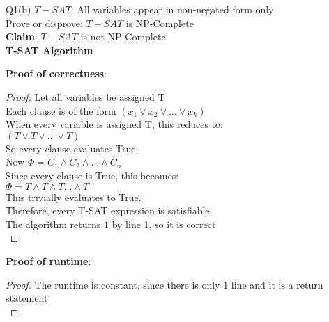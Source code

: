 \begin{problem}
    {Q1(b)}
    $T-SAT$: All variables appear in non-negated form only \\
    Prove or disprove: $T-SAT$ is NP-Complete \\
    \textbf{Claim}: $T-SAT$ is not NP-Complete \\
    \textbf{T-SAT Algorithm}
    \begin{algorithmic}[1]
    \end{algorithmic}
    \noindent
    \textbf{Proof of correctness}:
    \begin{proof}
        Let all variables be assigned T \\
        Each clause is of the form $(x_1 \lor x_2 \lor \dots \lor x_k)$ \\
        When every variable is assigned T, this reduces to: \\
        $(T \lor T \lor \dots \lor T)$ \\
        So every clause evaluates True. \\
        Now $\Phi = C_1 \land C_2 \land \dots \land C_n$ \\
        Since every clause is True, this becomes: \\
        $\Phi = T \land T \land T \dots \land T$ \\
        This trivially evaluates to True. \\
        Therefore, every T-SAT expression is satisfiable. \\
        The algorithm returns $1$ by line 1, so it is correct. \\
    \end{proof}
    \noindent
    \textbf{Proof of runtime}:
    \begin{proof}
        The runtime is constant, since there is only 1 line and it is a return statement \\
    \end{proof}
\end{problem}
